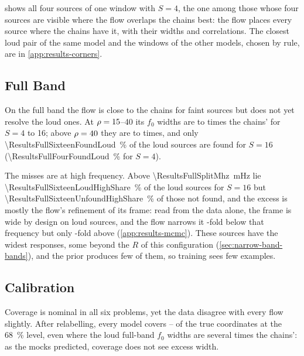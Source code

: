  shows all four sources of one window with $S=4$, the one among those whose four
sources are visible where the flow overlaps the chains best: the flow places every source where the
chains have it, with their widths and correlations. The closest loud pair of the same model and the
windows of the other models, chosen by rule, are in \cref{app:results-corners}.

\subsection{Full Band}
\label{sec:results-full}

On the full band the flow is close to the chains for faint sources but does not yet resolve the
loud ones. At $\rho=15$--40 its $f_0$ widths are \ResultsFullFourFzeroMid{} to
\ResultsFullSixteenFzeroMid{} times the chains' for $S=4$ to 16; above $\rho=40$ they are
\ResultsFullFourFzeroLoud{} to \ResultsFullSixteenFzeroLoud{} times, and only
\qty{\ResultsFullSixteenFoundLoud}{\percent} of the loud sources are found for $S=16$
(\qty{\ResultsFullFourFoundLoud}{\percent} for $S=4$).

The misses are at high frequency. Above \qty{\ResultsFullSplitMhz}{\milli\hertz} lie
\qty{\ResultsFullSixteenLoudHighShare}{\percent} of the loud sources for $S=16$ but
\qty{\ResultsFullSixteenUnfoundHighShare}{\percent} of those not found, and the excess is mostly the
flow's refinement of its frame: read from the data alone, the frame is wide by design on loud
sources, and the flow narrows it \ResultsFullSixteenContractLow-fold below that frequency but only
\ResultsFullSixteenContractHigh-fold above (\cref{app:results-mcmc}). These sources have the widest
responses, some beyond the $R$ of this configuration (\cref{sec:narrow-band-bands}), and the prior
produces few of them, so training sees few examples.

\subsection{Calibration}
\label{sec:results-calibration}

Coverage is nominal in all six problems, yet the data disagree with every flow slightly. After
relabelling, every model covers \ResultsCoverSixtyEightLo--\ResultsCoverSixtyEightHi{} of the true
coordinates at the \qty{68}{\percent} level, even where the loud full-band $f_0$ widths are several
times the chains': as the mocks predicted, coverage does not see excess width.

